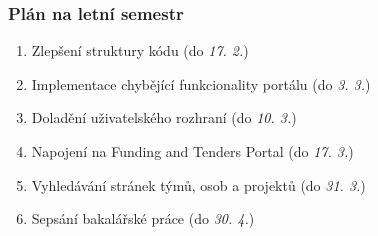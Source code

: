 \documentclass[10pt,xcolor=pdflatex]{beamer}
\begin{document}
\begin{frame}
    \frametitle{Plán na letní semestr}
    \begin{enumerate}
        \item Zlepšení struktury kódu (do \emph{17. 2.})
        \item Implementace chybějící funkcionality portálu (do \emph{3. 3.})
        \item Doladění uživatelského rozhraní (do \emph{10. 3.})
        \item Napojení na Funding and Tenders Portal (do \emph{17. 3.})
        \item Vyhledávání stránek týmů, osob a projektů (do \emph{31. 3.})
        \item Sepsání bakalářské práce (do \emph{30. 4.})
    \end{enumerate}
\end{frame}


\end{document}
